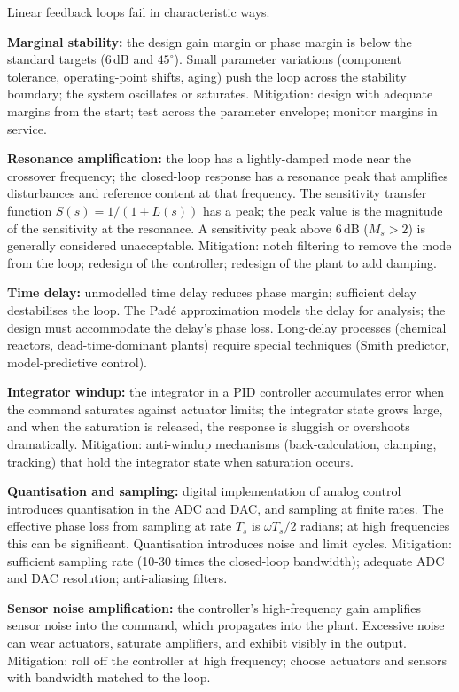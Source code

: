Linear feedback loops fail in characteristic ways.

\textbf{Marginal stability:} the design gain margin or phase margin is below the standard targets ($6\,\text{dB}$ and $45^\circ$). Small parameter variations (component tolerance, operating-point shifts, aging) push the loop across the stability boundary; the system oscillates or saturates. Mitigation: design with adequate margins from the start; test across the parameter envelope; monitor margins in service.

\textbf{Resonance amplification:} the loop has a lightly-damped mode near the crossover frequency; the closed-loop response has a resonance peak that amplifies disturbances and reference content at that frequency. The sensitivity transfer function $S(s) = 1/(1 + L(s))$ has a peak; the peak value is the magnitude of the sensitivity at the resonance. A sensitivity peak above $6\,\text{dB}$ ($M_s > 2$) is generally considered unacceptable. Mitigation: notch filtering to remove the mode from the loop; redesign of the controller; redesign of the plant to add damping.

\textbf{Time delay:} unmodelled time delay reduces phase margin; sufficient delay destabilises the loop. The Pad\'e approximation models the delay for analysis; the design must accommodate the delay's phase loss. Long-delay processes (chemical reactors, dead-time-dominant plants) require special techniques (Smith predictor, model-predictive control).

\textbf{Integrator windup:} the integrator in a PID controller accumulates error when the command saturates against actuator limits; the integrator state grows large, and when the saturation is released, the response is sluggish or overshoots dramatically. Mitigation: anti-windup mechanisms (back-calculation, clamping, tracking) that hold the integrator state when saturation occurs.

\textbf{Quantisation and sampling:} digital implementation of analog control introduces quantisation in the ADC and DAC, and sampling at finite rates. The effective phase loss from sampling at rate $T_s$ is $\omega T_s/2$ radians; at high frequencies this can be significant. Quantisation introduces noise and limit cycles. Mitigation: sufficient sampling rate (10-30 times the closed-loop bandwidth); adequate ADC and DAC resolution; anti-aliasing filters.

\textbf{Sensor noise amplification:} the controller's high-frequency gain amplifies sensor noise into the command, which propagates into the plant. Excessive noise can wear actuators, saturate amplifiers, and exhibit visibly in the output. Mitigation: roll off the controller at high frequency; choose actuators and sensors with bandwidth matched to the loop.

